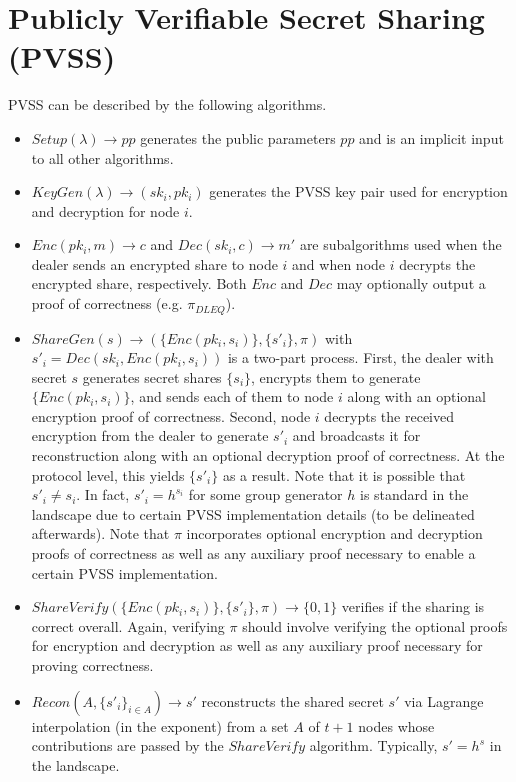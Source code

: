 \documentclass[letterpaper,twocolumn,10pt]{article}
\theoremstyle{definition}
\theoremstyle{remark}
\begin{document}
\section{Publicly Verifiable Secret Sharing (PVSS)}
\label{appendix:pvss}
PVSS can be described by the following algorithms.
\begin{itemize}
    \item $Setup(\lambda) \rightarrow pp$ generates the public parameters $pp$ and is an implicit input to all other algorithms.
    \item $KeyGen(\lambda) \rightarrow (sk_i, pk_i)$ generates the PVSS key pair used for encryption and decryption for node $i$.
    \item $Enc(pk_i, m) \rightarrow c$ and $Dec(sk_i, c) \rightarrow m'$ are subalgorithms used when the dealer sends an encrypted share to node $i$ and when node $i$ decrypts the encrypted share, respectively. Both $Enc$ and $Dec$ may optionally output a proof of correctness (e.g. $\pi_{DLEQ}$).
    \item $ShareGen(s) \rightarrow (\{Enc(pk_i, s_i)\}, \{s'_i\}, \pi)$ with $s'_i = Dec(sk_i, Enc(pk_i, s_i))$ is a two-part process. First, the dealer with secret $s$ generates secret shares $\{s_i\}$, encrypts them to generate $\{Enc(pk_i, s_i)\}$, and sends each of them to node $i$ along with an optional encryption proof of correctness. Second, node $i$ decrypts the received encryption from the dealer to generate $s'_i$ and broadcasts it for reconstruction along with an optional decryption proof of correctness. At the protocol level, this yields $\{s'_i\}$ as a result. Note that it is possible that $s'_i \neq s_i$. In fact, $s'_i = h^{s_i}$ for some group generator $h$ is standard in the landscape due to certain PVSS implementation details (to be delineated afterwards). Note that $\pi$ incorporates optional encryption and decryption proofs of correctness as well as any auxiliary proof necessary to enable a certain PVSS implementation.
    \item $ShareVerify(\{Enc(pk_i, s_i)\}, \{s'_i\}, \pi) \rightarrow \{0, 1\}$ verifies if the sharing is correct overall. Again, verifying $\pi$ should involve verifying the optional proofs for encryption and decryption as well as any auxiliary proof necessary for proving correctness.
    \item $Recon(A, \{s'_i\}_{i \in A}) \rightarrow s'$ reconstructs the shared secret $s'$ via Lagrange interpolation (in the exponent) from a set $A$ of $t + 1$ nodes whose contributions are passed by the $ShareVerify$ algorithm. Typically, $s' = h^s$ in the landscape.
\end{itemize}
\end{document}

